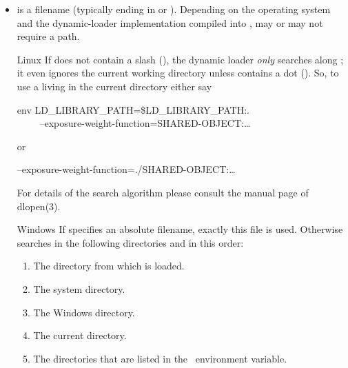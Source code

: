 \begin{itemize}
         {environment variable, }%
\item
   is a filename (typically ending in  or ).
  Depending on the operating system and the dynamic-loader implementation compiled into \appcmd,
   may or may not require a path.

  \begin{restrictedmaterial}{Linux}
    If  does not contain a slash (\sample{/}), the dynamic loader
    \emph{only} searches along ; it even ignores the current working
    directory unless  contains a dot ().  So, to use a
     living in the current directory either say
    \begin{literal}
      env LD\_LIBRARY\_PATH=\$LD\_LIBRARY\_PATH:. \bslash \\
      ~~~~\app{} --exposure-weight-function=\feasiblebreak SHARED-OBJECT:\dots
    \end{literal}
    or
    \begin{literal}
      \app{} --exposure-weight-function=\feasiblebreak ./SHARED-OBJECT:\dots
    \end{literal}

    For details of the search algorithm please consult the manual page of dlopen(3).
  \end{restrictedmaterial}

  \smallskip

  \begin{restrictedmaterial}{Windows}
    If  specifies an absolute filename, exactly this file is used.
    Otherwise \App{} searches in the following directories and in this order:

    \begin{enumerate}
    \item The directory from which \appcmd{} is loaded.
    \item The system directory.
    \item The Windows directory.
    \item The current directory.
    \item The directories that are listed in the ~environment variable.
    \end{enumerate}


\end{restrictedmaterial}
\end{itemize}
